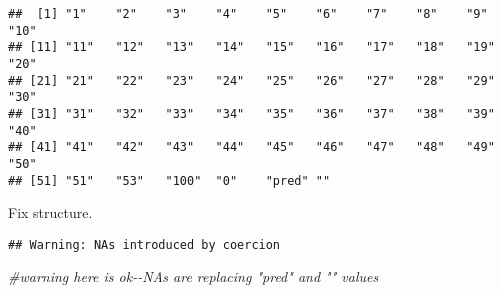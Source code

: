 \documentclass[
]{article}
\newenvironment{Shaded}{\begin{snugshade}}{\end{snugshade}}
\newcommand{\AttributeTok}[1]{\textcolor[rgb]{0.77,0.63,0.00}{#1}}
\newcommand{\CommentTok}[1]{\textcolor[rgb]{0.56,0.35,0.01}{\textit{#1}}}
\newcommand{\FunctionTok}[1]{\textcolor[rgb]{0.00,0.00,0.00}{#1}}
\newcommand{\NormalTok}[1]{#1}
\newcommand{\OtherTok}[1]{\textcolor[rgb]{0.56,0.35,0.01}{#1}}
\newcommand{\SpecialCharTok}[1]{\textcolor[rgb]{0.00,0.00,0.00}{#1}}
\newcommand{\StringTok}[1]{\textcolor[rgb]{0.31,0.60,0.02}{#1}}
\begin{document}
\begin{verbatim}
##  [1] "1"    "2"    "3"    "4"    "5"    "6"    "7"    "8"    "9"    "10"  
## [11] "11"   "12"   "13"   "14"   "15"   "16"   "17"   "18"   "19"   "20"  
## [21] "21"   "22"   "23"   "24"   "25"   "26"   "27"   "28"   "29"   "30"  
## [31] "31"   "32"   "33"   "34"   "35"   "36"   "37"   "38"   "39"   "40"  
## [41] "41"   "42"   "43"   "44"   "45"   "46"   "47"   "48"   "49"   "50"  
## [51] "51"   "53"   "100"  "0"    "pred" ""
\end{verbatim}

Fix structure.

\begin{Shaded}
\end{Shaded}

\begin{verbatim}
## Warning: NAs introduced by coercion
\end{verbatim}

\begin{Shaded}
\begin{Highlighting}[]
\CommentTok{\#warning here is ok{-}{-}NAs are replacing "pred" and "" values}
\end{Highlighting}
\end{Shaded}
\end{document}
